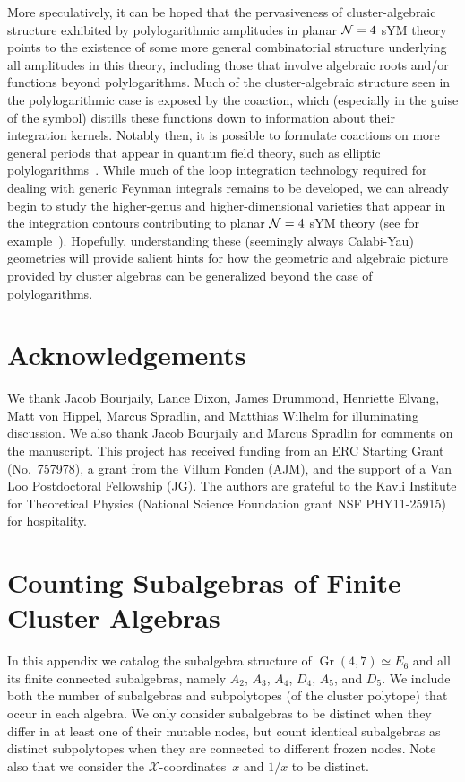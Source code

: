 \documentclass[12pt]{article}
\DeclareMathOperator{\Gr}{Gr}
\def\xcoords{$\mathcal{X}$-coordinates}
\begin{document}
More speculatively, it can be hoped that the pervasiveness of cluster-algebraic structure exhibited by polylogarithmic amplitudes in planar ${\cal N} = 4$ sYM theory points to the existence of some more general combinatorial structure underlying all amplitudes in this theory, including those that involve algebraic roots and/or functions beyond polylogarithms. Much of the cluster-algebraic structure seen in the polylogarithmic case is exposed by the coaction, which (especially in the guise of the symbol) distills these functions down to information about their integration kernels. Notably then, it is possible to formulate coactions on more general periods that appear in quantum field theory, such as elliptic polylogarithms~\cite{2015arXiv151206410B,Abreu:2017enx,Abreu:2017mtm,Broedel:2017kkb,Caron-Huot:2018dsv,Broedel:2018iwv,Broedel:2018qkq}. While much of the loop integration technology required for dealing with generic Feynman integrals remains to be developed, we can already begin to study the higher-genus and higher-dimensional varieties that appear in the integration contours contributing to planar ${\cal N} = 4$ sYM theory (see for example~\cite{2009arXiv0910.0114B,Bourjaily:2017bsb,Bourjaily:2018ycu,Bourjaily:2018yfy}). Hopefully, understanding these (seemingly always Calabi-Yau) geometries will provide salient hints for how the geometric and algebraic picture provided by cluster algebras can be generalized beyond the case of polylogarithms.

\section*{Acknowledgements}

We thank Jacob Bourjaily, Lance Dixon, James Drummond, Henriette Elvang, Matt von Hippel, Marcus Spradlin, and Matthias Wilhelm for illuminating discussion. We also thank Jacob Bourjaily and Marcus Spradlin for comments on the manuscript. This project has received funding from an ERC Starting Grant \mbox{(No.\ 757978)}, a grant from the Villum Fonden (AJM), and the support of a Van Loo Postdoctoral Fellowship (JG). The authors are grateful to the Kavli Institute for Theoretical Physics (National Science Foundation grant NSF PHY11-25915) for hospitality. 


\appendix

\newpage

\section{Counting Subalgebras of Finite Cluster Algebras}\label{appendix:subalgebras}
In this appendix we catalog the subalgebra structure of $\Gr(4,7) \simeq E_6$ and all its finite connected subalgebras, namely $A_2$, $A_3$, $A_4$, $D_4$, $A_5$, and $D_5$. We include both the number of subalgebras and subpolytopes (of the cluster polytope) that occur in each algebra. We only consider subalgebras to be distinct when they differ in at least one of their mutable nodes, but count identical subalgebras as distinct subpolytopes when they are connected to different frozen nodes. Note also that we consider the \xcoords\ $x$ and $1/x$ to be distinct.
\end{document}
